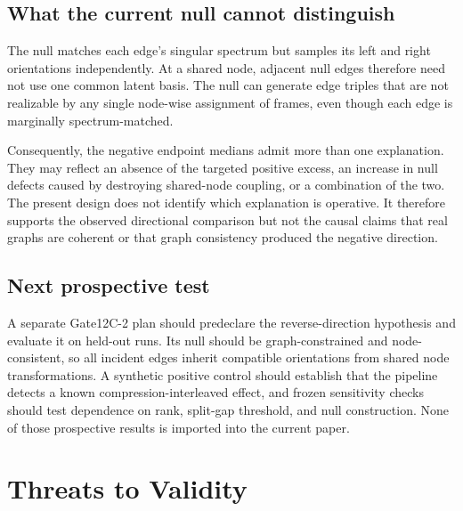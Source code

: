 \documentclass[11pt]{article}
\begin{document}
\subsection{What the current null cannot distinguish}

The null matches each edge's singular spectrum but samples its left and right
orientations independently. At a shared node, adjacent null edges therefore
need not use one common latent basis. The null can generate edge triples that
are not realizable by any single node-wise assignment of frames, even though
each edge is marginally spectrum-matched.

Consequently, the negative endpoint medians admit more than one explanation.
They may reflect an absence of the targeted positive excess, an increase in
null defects caused by destroying shared-node coupling, or a combination of
the two. The present design does not identify which explanation is operative.
It therefore supports the observed directional comparison but not the causal
claims that real graphs are coherent or that graph consistency produced the
negative direction.

\subsection{Next prospective test}

A separate Gate12C-2 plan should predeclare the reverse-direction hypothesis
and evaluate it on held-out runs. Its null should be graph-constrained and
node-consistent, so all incident edges inherit compatible orientations from
shared node transformations. A synthetic positive control should establish
that the pipeline detects a known compression-interleaved effect, and frozen
sensitivity checks should test dependence on rank, split-gap threshold, and
null construction. None of those prospective results is imported into the
current paper.

\section{Threats to Validity}
\label{sec:threats}
\end{document}
